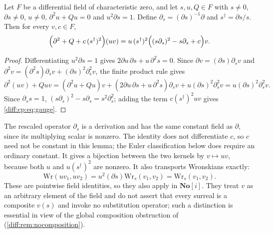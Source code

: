 \documentclass[11pt,letterpaper]{article}
\numberwithin{equation}{section}
\theoremstyle{definition}
\theoremstyle{remark}
\newcommand{\SC}{\mathbf{No}[i]}
\newcommand{\der}{\partial}
\begin{document}
\begin{lemma}
\label{diff:cp:lem:gauge}
Let $F$ be a differential field of characteristic zero, and let
$s,u,Q\in F$ with $s\neq0$, $\der s\neq0$, $u\neq0$,
$\der^{2}u+Qu=0$ and $u^{2}\der s=1$. Define
$\der_{s}=(\der s)^{-1}\der$ and $s^{\dagger}=\der s/s$.
Then for every $v,c\in F$,
\begin{equation}\label{diff:cp:eq:gauge}
 \Bigl(\der^{2}+Q+c\,(s^{\dagger})^{2}\Bigr)(uv)
 =u\,(s^{\dagger})^{2}\Bigl((s\der_{s})^{2}-s\der_{s}+c\Bigr)v .
\end{equation}
\end{lemma}
\begin{proof}
Differentiating $u^{2}\der s=1$ gives $2\der u\,\der s+u\,\der^{2}s=0$. Since
$\der v=(\der s)\der_{s}v$ and $\der^{2}v=(\der^{2}s)\der_{s}v+(\der s)^{2}\der_{s}^{2}v$,
the finite product rule gives
\[
 \der^{2}(uv)+Quv=(\der^{2}u+Qu)v+(2\der u\,\der s+u\,\der^{2}s)\der_{s}v
 +u(\der s)^{2}\der_{s}^{2}v=u(\der s)^{2}\der_{s}^{2}v .
\]
Since $\der_{s}s=1$, $(s\der_{s})^{2}-s\der_{s}=s^{2}\der_{s}^{2}$; adding the
term $c(s^{\dagger})^{2}uv$ gives \cref{diff:cp:eq:gauge}.
\end{proof}

The rescaled operator $\der_{s}$ is a derivation and has the same
constant field as $\der$, since its multiplying scalar is nonzero.
The identity does not differentiate $c$, so $c$ need not be constant
in this lemma; the Euler classification below does require an
ordinary constant. It gives a bijection between the two kernels
by $v\mapsto uv$, because both $u$ and $u(s^{\dagger})^{2}$ are
nonzero. It also transports Wronskians exactly:
\[
 \mathrm{Wr}(uv_{1},uv_{2})
 =u^{2}(\der s)\mathrm{Wr}_{s}(v_{1},v_{2})
 =\mathrm{Wr}_{s}(v_{1},v_{2}).
\]
These are pointwise field identities, so they also apply in $\SC$.
They treat $v$ as an arbitrary element of the field and do not
assert that every surreal is a composite $v(s)$ and invoke no substitution
operator; such a distinction is essential in view of the global
composition obstruction of \cite[Theorem~8.4]{BMGerms}
(\cref{diff:rem:nocomposition}).
\end{document}

